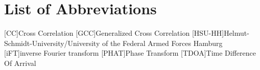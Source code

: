 \chapter*{List of Abbreviations}
\label{sec:abbreviations}

\begin{acronym}[HSU-HH]
  [CC]{Cross Correlation}
  [GCC]{Generalized Cross Correlation}
  [HSU-HH]{Helmut-Schmidt-University/University of the Federal Armed Forces Hamburg}
  [iFT]{inverse Fourier transform}
  [PHAT]{Phase Transform}
  [TDOA]{Time Difference Of Arrival}
\end{acronym}
